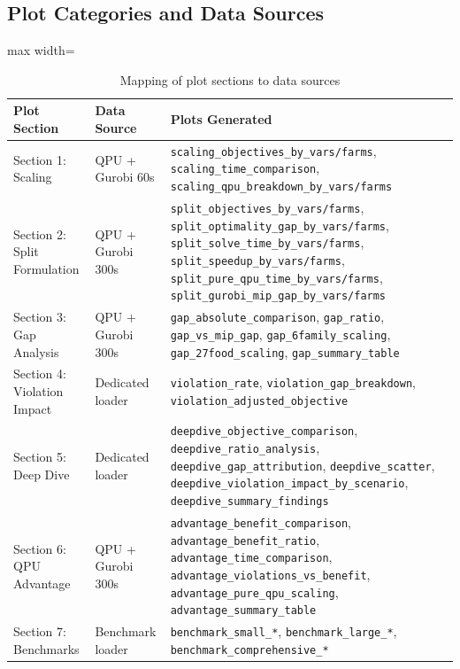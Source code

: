 \documentclass[11pt,a4paper]{article}
\begin{document}
\subsection{Plot Categories and Data Sources}

\begin{table}[H]
\centering
\caption{Mapping of plot sections to data sources}
\label{tab:plot_mapping}
\small
\begin{adjustbox}{max width=\textwidth}
\begin{tabular}{@{}p{4cm}p{3cm}p{6cm}@{}}
\toprule
\textbf{Plot Section} & \textbf{Data Source} & \textbf{Plots Generated} \\
\midrule
Section 1: Scaling & QPU + Gurobi 60s & \texttt{scaling\_objectives\_by\_vars/farms}, \texttt{scaling\_time\_comparison}, \texttt{scaling\_qpu\_breakdown\_by\_vars/farms} \\
\addlinespace
Section 2: Split Formulation & QPU + Gurobi 300s & \texttt{split\_objectives\_by\_vars/farms}, \texttt{split\_optimality\_gap\_by\_vars/farms}, \texttt{split\_solve\_time\_by\_vars/farms}, \texttt{split\_speedup\_by\_vars/farms}, \texttt{split\_pure\_qpu\_time\_by\_vars/farms}, \texttt{split\_gurobi\_mip\_gap\_by\_vars/farms} \\
\addlinespace
Section 3: Gap Analysis & QPU + Gurobi 300s & \texttt{gap\_absolute\_comparison}, \texttt{gap\_ratio}, \texttt{gap\_vs\_mip\_gap}, \texttt{gap\_6family\_scaling}, \texttt{gap\_27food\_scaling}, \texttt{gap\_summary\_table} \\
\addlinespace
Section 4: Violation Impact & Dedicated loader & \texttt{violation\_rate}, \texttt{violation\_gap\_breakdown}, \texttt{violation\_adjusted\_objective} \\
\addlinespace
Section 5: Deep Dive & Dedicated loader & \texttt{deepdive\_objective\_comparison}, \texttt{deepdive\_ratio\_analysis}, \texttt{deepdive\_gap\_attribution}, \texttt{deepdive\_scatter}, \texttt{deepdive\_violation\_impact\_by\_scenario}, \texttt{deepdive\_summary\_findings} \\
\addlinespace
Section 6: QPU Advantage & QPU + Gurobi 300s & \texttt{advantage\_benefit\_comparison}, \texttt{advantage\_benefit\_ratio}, \texttt{advantage\_time\_comparison}, \texttt{advantage\_violations\_vs\_benefit}, \texttt{advantage\_pure\_qpu\_scaling}, \texttt{advantage\_summary\_table} \\
\addlinespace
Section 7: Benchmarks & Benchmark loader & \texttt{benchmark\_small\_*}, \texttt{benchmark\_large\_*}, \texttt{benchmark\_comprehensive\_*} \\
\bottomrule
\end{tabular}
\end{adjustbox}
\end{table}
\end{document}
